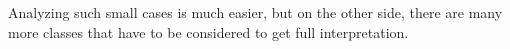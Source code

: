 \documentclass[final]{article}
\theoremstyle{definition}
\theoremstyle{remark}
\newcommand{\includeinlinescaledsvg}[3]{\begin{minipage}{#1\textwidth}\begin{center}\end{center}\end{minipage}}
\begin{document}
\begin{longtable}{| c | c |}

\end{longtable}

Analyzing such small cases is much easier, but on the other side, there are many more classes that have to be considered to get full interpretation.
\end{document}
